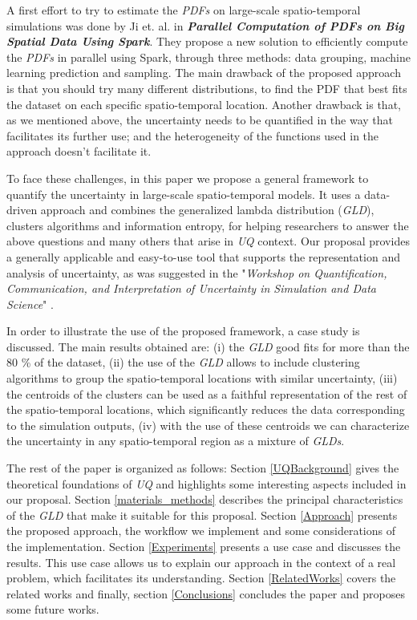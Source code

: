 A first effort to try to estimate the \textit{PDFs} on large-scale spatio-temporal simulations was done by \cite{Liu2018} {Ji et. al.} in \textbf{\textit{Parallel Computation of PDFs on Big Spatial Data Using Spark}}. They propose a new solution to efficiently compute the \textit{PDFs} in parallel using Spark, through three methods: data grouping, machine learning prediction and sampling. The main drawback of the proposed approach is that you should try many different distributions, to find the PDF that best fits the dataset on each specific spatio-temporal location. Another drawback is that, as we mentioned above, the uncertainty needs to be quantified in the way that facilitates its further use; and the heterogeneity of the functions used in the approach doesn't facilitate it. 

To face these challenges, in this paper we propose a general framework to quantify the uncertainty in large-scale spatio-temporal models. It uses a data-driven approach and combines the generalized lambda distribution (\textit{GLD}), clusters algorithms and information entropy, for helping researchers to answer the above questions and many others that arise in \textit{UQ} context. Our proposal provides a generally applicable and easy-to-use tool that supports the representation and analysis of uncertainty, as was suggested in the "\textit{Workshop on Quantification, Communication, and Interpretation of Uncertainty in Simulation and Data Science}" \cite{Tobergte2013}. 

In order to illustrate the use of the proposed framework, a case study is discussed. The main results obtained are: (i) the \textit{GLD} good fits for more than the 80 \% of the dataset, (ii) the use of the \textit{GLD} allows to include clustering algorithms to group the spatio-temporal locations with similar uncertainty, (iii) the centroids  of the clusters can be used as a faithful representation of the rest of the spatio-temporal locations, which significantly reduces the data corresponding to the simulation outputs, (iv) with the use of these centroids we can characterize the uncertainty in any spatio-temporal region as a mixture of \textit{GLDs}.

The rest of the paper is organized as follows: Section \ref{UQBackground} gives the theoretical foundations of \textit{UQ} and highlights some interesting aspects included in our proposal. Section \ref{materials_methods} describes the principal characteristics of the \textit{GLD} that make it suitable for this proposal. Section \ref{Approach} presents the proposed approach, the workflow we implement and some considerations of the implementation. Section \ref{Experiments} presents a use case and discusses the results. This use case allows us to explain our approach in the context of a real problem, which facilitates its understanding. Section \ref{RelatedWorks} covers the related works and finally, section \ref{Conclusions} concludes the paper and proposes some future works.

